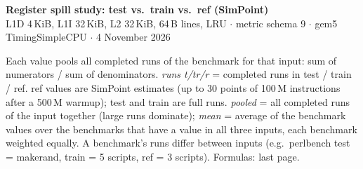 \documentclass[10pt,a4paper,landscape]{article}
\begin{document}
\begin{center}
{\large\bfseries Register spill study: test vs.\ train vs.\ ref (SimPoint)}\\[3pt]
{\small L1D 4\,KiB, L1I 32\,KiB, L2 32\,KiB, 64\,B lines, LRU $\cdot$ metric schema 9 $\cdot$ gem5 TimingSimpleCPU $\cdot$ 4 November 2026}
\end{center}
{\footnotesize Each value pools all completed runs of the benchmark for that input: sum of numerators / sum of denominators. \emph{runs t/tr/r} = completed runs in test / train / ref. ref values are SimPoint estimates (up to 30 points of 100\,M instructions after a 500\,M warmup); test and train are full runs. \emph{pooled} = all completed runs of the input together (large runs dominate); \emph{mean} = average of the benchmark values over the benchmarks that have a value in all three inputs, each benchmark weighted equally. A benchmark's runs differ between inputs (e.g.\ perlbench test = makerand, train = 5 scripts, ref = 3 scripts). Formulas: last page.\par}
\end{document}
